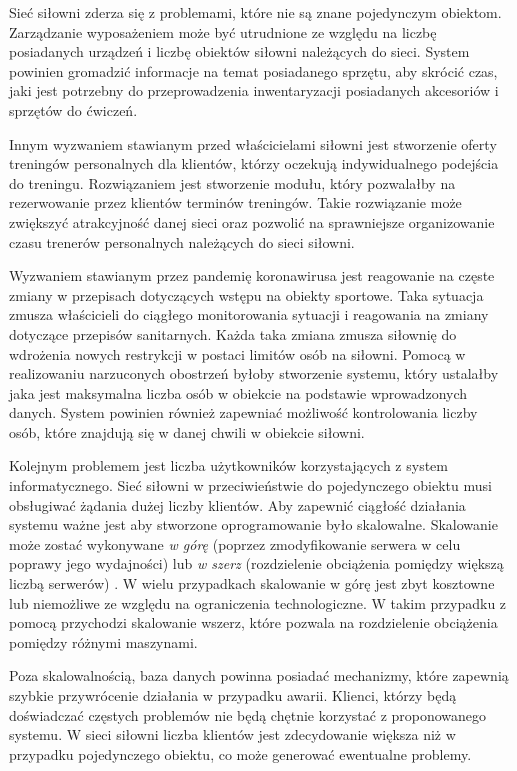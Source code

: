 \documentclass[a4paper,twoside,12pt]{book}
\begin{document}
Sieć siłowni zderza się z problemami, które nie są znane pojedynczym obiektom. Zarządzanie wyposażeniem może być utrudnione ze względu na liczbę posiadanych urządzeń i liczbę obiektów siłowni należących do sieci. System powinien gromadzić informacje na temat posiadanego sprzętu, aby skrócić czas, jaki jest potrzebny do przeprowadzenia inwentaryzacji posiadanych akcesoriów i sprzętów do ćwiczeń.

Innym wyzwaniem stawianym przed właścicielami siłowni jest stworzenie oferty treningów personalnych dla klientów, którzy oczekują indywidualnego podejścia do treningu. Rozwiązaniem jest stworzenie modułu, który pozwalałby na rezerwowanie przez klientów terminów treningów. Takie rozwiązanie może zwiększyć atrakcyjność danej sieci oraz pozwolić na sprawniejsze organizowanie czasu trenerów personalnych należących do sieci siłowni.

Wyzwaniem stawianym przez pandemię koronawirusa jest reagowanie na częste zmiany w przepisach dotyczących wstępu na obiekty sportowe. Taka sytuacja zmusza właścicieli do ciągłego monitorowania sytuacji i reagowania na zmiany dotyczące przepisów sanitarnych. Każda taka zmiana zmusza siłownię do wdrożenia nowych restrykcji w postaci limitów osób na siłowni. Pomocą w realizowaniu narzuconych obostrzeń byłoby stworzenie systemu, który ustalałby jaka jest maksymalna liczba osób w obiekcie na podstawie wprowadzonych danych. System powinien również zapewniać możliwość kontrolowania liczby osób, które znajdują się w danej chwili w obiekcie siłowni.

Kolejnym problemem jest liczba użytkowników korzystających z system informatycznego. Sieć siłowni w przeciwieństwie do pojedynczego obiektu musi obsługiwać żądania dużej liczby klientów. Aby zapewnić ciągłość działania systemu ważne jest aby stworzone oprogramowanie było skalowalne. Skalowanie może zostać wykonywane \textit{w górę} (poprzez zmodyfikowanie serwera w celu poprawy jego wydajności) lub \textit{w szerz} (rozdzielenie obciążenia pomiędzy większą liczbą serwerów) \cite{bib:mongodb_guide}. W wielu przypadkach skalowanie w górę jest zbyt kosztowne lub niemożliwe ze względu na ograniczenia technologiczne. W takim przypadku z pomocą przychodzi skalowanie wszerz, które pozwala na rozdzielenie obciążenia pomiędzy różnymi maszynami.

Poza skalowalnością, baza danych powinna posiadać mechanizmy, które zapewnią szybkie przywrócenie działania w przypadku awarii. Klienci, którzy będą doświadczać częstych problemów nie będą chętnie korzystać z proponowanego systemu. W sieci siłowni liczba klientów jest zdecydowanie większa niż w przypadku pojedynczego obiektu, co może generować ewentualne problemy.
\end{document}
